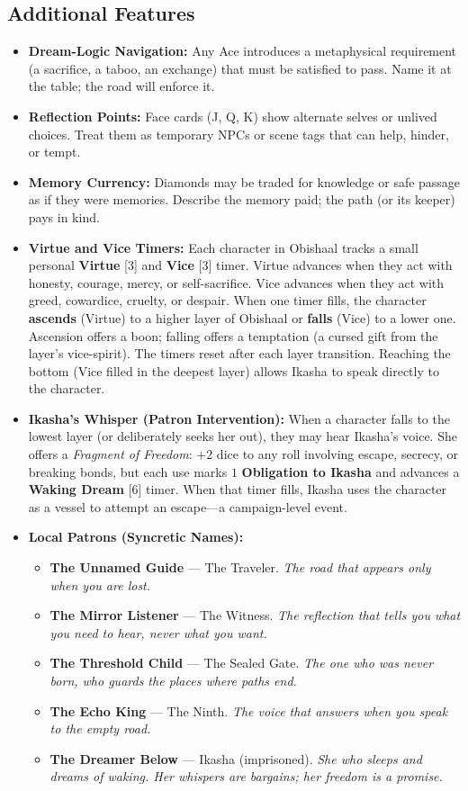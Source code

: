 \subsection*{Additional Features}
\label{sec:ways-between-features}
\begin{itemize}
\item \textbf{Dream-Logic Navigation:} Any Ace introduces a metaphysical requirement (a sacrifice, a taboo, an exchange) that must be satisfied to pass. Name it at the table; the road will enforce it.
\item \textbf{Reflection Points:} Face cards (J, Q, K) show alternate selves or unlived choices. Treat them as temporary NPCs or scene tags that can help, hinder, or tempt.
\item \textbf{Memory Currency:} Diamonds may be traded for knowledge or safe passage as if they were memories. Describe the memory paid; the path (or its keeper) pays in kind.
\item \textbf{Virtue and Vice Timers:} Each character in Obishaal tracks a small personal \textbf{Virtue} [3] and \textbf{Vice} [3] timer. Virtue advances when they act with honesty, courage, mercy, or self-sacrifice. Vice advances when they act with greed, cowardice, cruelty, or despair. When one timer fills, the character \textbf{ascends} (Virtue) to a higher layer of Obishaal or \textbf{falls} (Vice) to a lower one. Ascension offers a boon; falling offers a temptation (a cursed gift from the layer's vice-spirit). The timers reset after each layer transition. Reaching the bottom (Vice filled in the deepest layer) allows Ikasha to speak directly to the character.
\item \textbf{Ikasha's Whisper (Patron Intervention):} When a character falls to the lowest layer (or deliberately seeks her out), they may hear Ikasha's voice. She offers a \emph{Fragment of Freedom}: $+2$ dice to any roll involving escape, secrecy, or breaking bonds, but each use marks $1$ \textbf{Obligation to Ikasha} and advances a \textbf{Waking Dream} [6] timer. When that timer fills, Ikasha uses the character as a vessel to attempt an escape---a campaign-level event.
\item \textbf{Local Patrons (Syncretic Names):}
  \begin{itemize}
    \item \textbf{The Unnamed Guide} --- The Traveler. \textit{The road that appears only when you are lost.}
    \item \textbf{The Mirror Listener} --- The Witness. \textit{The reflection that tells you what you need to hear, never what you want.}
    \item \textbf{The Threshold Child} --- The Sealed Gate. \textit{The one who was never born, who guards the places where paths end.}
    \item \textbf{The Echo King} --- The Ninth. \textit{The voice that answers when you speak to the empty road.}
    \item \textbf{The Dreamer Below} --- Ikasha (imprisoned). \textit{She who sleeps and dreams of waking. Her whispers are bargains; her freedom is a promise.}
  \end{itemize}
\end{itemize}

